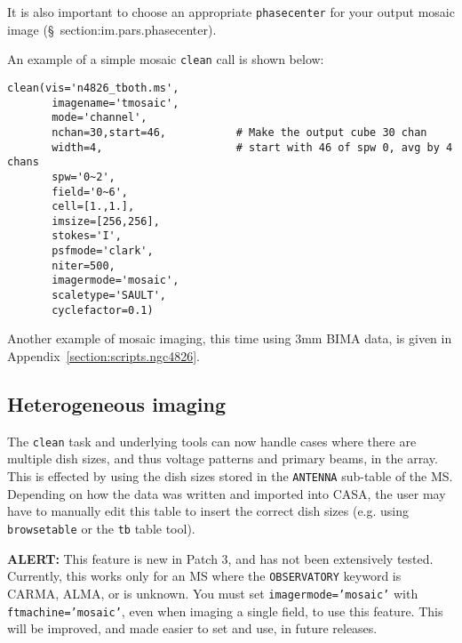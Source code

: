 It is also important to choose an appropriate {\tt phasecenter} for
your output mosaic image (\S~{section:im.pars.phasecenter}).

An example of a simple mosaic {\tt clean} call is shown below: 
\small
\begin{verbatim}
clean(vis='n4826_tboth.ms',        
       imagename='tmosaic',         
       mode='channel',
       nchan=30,start=46,           # Make the output cube 30 chan
       width=4,                     # start with 46 of spw 0, avg by 4 chans
       spw='0~2',
       field='0~6',
       cell=[1.,1.],
       imsize=[256,256],
       stokes='I',
       psfmode='clark',
       niter=500,
       imagermode='mosaic',
       scaletype='SAULT',
       cyclefactor=0.1)
\end{verbatim}
\normalsize

Another example of mosaic imaging, this time using 3mm BIMA data,
is given in Appendix~\ref{section:scripts.ngc4826}.

\subsection{Heterogeneous imaging}
\label{section:im.clean.hetero}

The {\tt clean} task and underlying tools can now handle cases where
there are multiple dish sizes, and thus voltage patterns and primary
beams, in the array.  This is effected by using the dish sizes stored
in the {\tt ANTENNA} sub-table of the MS.  Depending on how the data
was written and imported into CASA, the user may have to manually edit
this table to insert the correct dish sizes (e.g. using {\tt
browsetable} or the {\tt tb} table tool).  

{\bf ALERT:} This feature is new in Patch 3, and has not been
extensively tested.  Currently, this works only for an MS where the
{\tt OBSERVATORY} keyword is CARMA, ALMA, or is unknown.  You must
set {\tt imagermode='mosaic'} with {\tt ftmachine='mosaic'}, even
when imaging a single field, to use this feature.
This will be improved, and made easier to set and use, in future
releases.  

